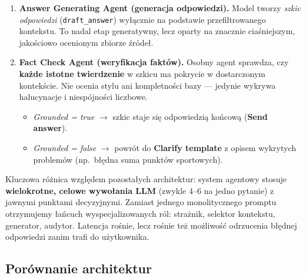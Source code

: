 \begin{tcolorbox}[colback=blue!5!white,colframe=blue!75!black,title=Opis etapów pipeline'u agentowego]
\begin{enumerate}[leftmargin=*, nosep]
        \item \textbf{Answer Generating Agent (generacja odpowiedzi).}
              Model tworzy \textit{szkic odpowiedzi} (\texttt{draft\_answer}) wyłącznie na podstawie przefiltrowanego kontekstu.
              To nadal etap generatywny, lecz oparty na znacznie ciaśniejszym, jakościowo ocenionym zbiorze źródeł.

        \item \textbf{Fact Check Agent (weryfikacja faktów).}
              Osobny agent sprawdza, czy \textbf{każde istotne twierdzenie} w szkicu ma pokrycie w dostarczonym kontekście.
              Nie ocenia stylu ani kompletności bazy --- jedynie wykrywa halucynacje i niespójności liczbowe.
              \begin{itemize}[nosep]
                  \item \textit{Grounded = true} $\rightarrow$ szkic staje się odpowiedzią końcową (\textbf{Send answer}).
                  \item \textit{Grounded = false} $\rightarrow$ powrót do \textbf{Clarify template} z opisem wykrytych problemów
                        (np.\ błędna suma punktów sportowych).
              \end{itemize}
    \end{enumerate}
\end{tcolorbox}

\vspace{0.5em}

\noindent
Kluczowa różnica względem pozostałych architektur: system agentowy stosuje \textbf{wielokrotne, celowe wywołania LLM}
(zwykle 4--6 na jedno pytanie) z jawnymi punktami decyzyjnymi. Zamiast jednego monolitycznego promptu otrzymujemy
łańcuch wyspecjalizowanych ról: strażnik, selektor kontekstu, generator, audytor. Latencja rośnie, lecz rośnie też
możliwość odrzucenia błędnej odpowiedzi zanim trafi do użytkownika.

\vspace{1em}

\subsection*{Porównanie architektur}

